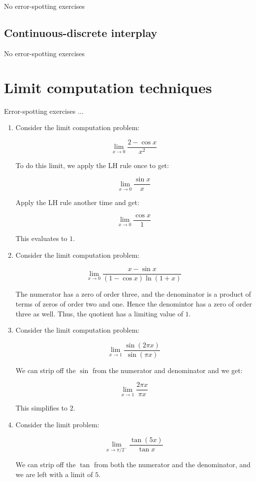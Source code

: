 \documentclass[10pt]{amsart}
\begin{document}
No error-spotting exercises

\subsection{Continuous-discrete interplay}

No error-spotting exercises

\section{Limit computation techniques}

Error-spotting exercises ...

\begin{enumerate}
\item Consider the limit computation problem:

  $$\lim_{x \to 0} \frac{2 - \cos x}{x^2}$$

  To do this limit, we apply the LH rule once to get:

  $$\lim_{x \to 0} \frac{\sin x}{x}$$

  Apply the LH rule another time and get:

  $$\lim_{x \to 0} \frac{\cos x}{1}$$

  This evaluates to $1$.
\item Consider the limit computation problem:

  $$\lim_{x \to 0} \frac{x - \sin x}{(1 - \cos x)\ln (1 + x)}$$

  The numerator has a zero of order three, and the denominator is a
  product of terms of zeros of order two and one. Hence the denomintor
  has a zero of order three as well. Thus, the quotient has a limiting
  value of $1$.

\item Consider the limit computation problem:

  $$\lim_{x \to 1} \frac{\sin(2 \pi x)}{\sin (\pi x)}$$

  We can strip off the $\sin$ from the numerator and denominator and we get:

  $$\lim_{x \to 1} \frac{2 \pi x}{\pi x}$$

  This simplifies to $2$.

\item Consider the limit problem:

  $$\lim_{x \to \pi/2^-} \frac{\tan(5x)}{\tan x}$$

  We can strip off the $\tan$ from both the numerator and the
  denominator, and we are left with a limit of $5$.
\end{enumerate}
\end{document}
